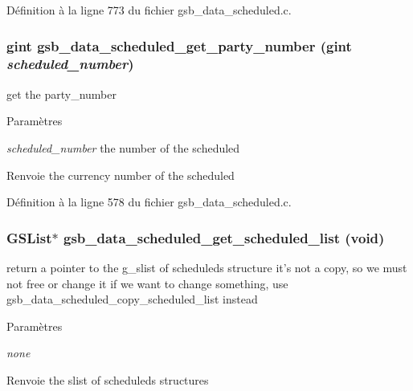 Définition à la ligne 773 du fichier gsb\_\-data\_\-scheduled.c.

\subsubsection[{gsb\_\-data\_\-scheduled\_\-get\_\-party\_\-number}]{\setlength{\rightskip}{0pt plus 5cm}gint gsb\_\-data\_\-scheduled\_\-get\_\-party\_\-number (gint {\em scheduled\_\-number})}\label{gsb__data__scheduled_8h_a3005278f65b2a095b1ccebdbf7a70f3d}
get the party\_\-number


\begin{DoxyParams}{Paramètres}
\item[{\em scheduled\_\-number}]the number of the scheduled\end{DoxyParams}
\begin{DoxyReturn}{Renvoie}
the currency number of the scheduled 
\end{DoxyReturn}


Définition à la ligne 578 du fichier gsb\_\-data\_\-scheduled.c.

\subsubsection[{gsb\_\-data\_\-scheduled\_\-get\_\-scheduled\_\-list}]{\setlength{\rightskip}{0pt plus 5cm}GSList$\ast$ gsb\_\-data\_\-scheduled\_\-get\_\-scheduled\_\-list (void)}\label{gsb__data__scheduled_8h_a9e321b67331018d8f0a42022643a10d2}
return a pointer to the g\_\-slist of scheduleds structure it's not a copy, so we must not free or change it if we want to change something, use gsb\_\-data\_\-scheduled\_\-copy\_\-scheduled\_\-list instead


\begin{DoxyParams}{Paramètres}
\item[{\em none}]\end{DoxyParams}
\begin{DoxyReturn}{Renvoie}
the slist of scheduleds structures 
\end{DoxyReturn}


